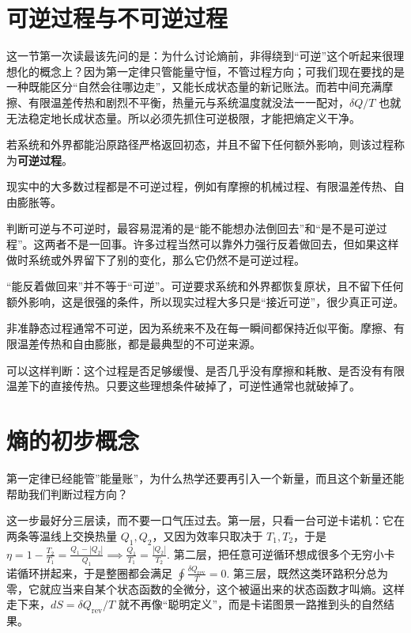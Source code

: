 \documentclass[lang=cn,11pt]{elegantbook}
\newcommand{\bridge}[1]{\begin{note}#1\end{note}}
\begin{document}
\section{可逆过程与不可逆过程}

这一节第一次读最该先问的是：为什么讨论熵前，非得绕到“可逆”这个听起来很理想化的概念上？因为第一定律只管能量守恒，不管过程方向；可我们现在要找的是一种既能区分“自然会往哪边走”，又能长成状态量的新记账法。而若中间充满摩擦、有限温差传热和剧烈不平衡，热量元与系统温度就没法一一配对，\(\delta Q/T\) 也就无法稳定地长成状态量。所以必须先抓住可逆极限，才能把熵定义干净。

\begin{definition}[可逆过程]\label{def:reversible-process}
若系统和外界都能沿原路径严格返回初态，并且不留下任何额外影响，则该过程称为\textbf{可逆过程}。
\end{definition}

现实中的大多数过程都是不可逆过程，例如有摩擦的机械过程、有限温差传热、自由膨胀等。

判断可逆与不可逆时，最容易混淆的是“能不能想办法倒回去”和“是不是可逆过程”。这两者不是一回事。许多过程当然可以靠外力强行反着做回去，但如果这样做时系统或外界留下了别的变化，那么它仍然不是可逆过程。

\begin{note}
“能反着做回来”并不等于“可逆”。可逆要求系统和外界都恢复原状，且不留下任何额外影响，这是很强的条件，所以现实过程大多只是“接近可逆”，很少真正可逆。
\end{note}

\begin{remark}
非准静态过程通常不可逆，因为系统来不及在每一瞬间都保持近似平衡。摩擦、有限温差传热和自由膨胀，都是最典型的不可逆来源。
\end{remark}

\begin{remark}
可以这样判断：这个过程是否足够缓慢、是否几乎没有摩擦和耗散、是否没有有限温差下的直接传热。只要这些理想条件破掉了，可逆性通常也就破掉了。
\end{remark}

\section{熵的初步概念}

 第一定律已经能管”能量账”，为什么热学还要再引入一个新量，而且这个新量还能帮助我们判断过程方向？

\bridge{这一步最好分三层读，而不要一口气压过去。第一层，只看一台可逆卡诺机：它在两条等温线上交换热量 \(Q_1,Q_2\)，又因为效率只取决于 \(T_1,T_2\)，于是
 \(\eta=1-\frac{T_2}{T_1} =\frac{Q_1-|Q_2|}{Q_1} \implies \frac{Q_1}{T_1}=\frac{|Q_2|}{T_2}.\) 
第二层，把任意可逆循环想成很多个无穷小卡诺循环拼起来，于是整圈都会满足
 \(\oint \frac{\delta Q_{\mathrm{rev}}}{T}=0.\) 
第三层，既然这类环路积分总为零，它就应当来自某个状态函数的全微分，这个被逼出来的状态函数才叫熵。这样走下来，\(dS=\delta Q_{\mathrm{rev}}/T\) 就不再像“聪明定义”，而是卡诺图景一路推到头的自然结果。}
\end{document}
